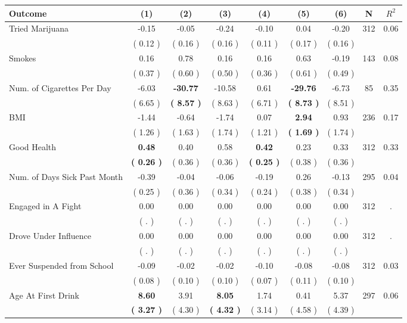 \begin{tabular}{lcccccccc}
\toprule
 \textbf{Outcome} & \textbf{(1)} & \textbf{(2)} & \textbf{(3)} & \textbf{(4)} & \textbf{(5)} & \textbf{(6)} & \textbf{N} & \textbf{$ R^2$} \\
\midrule
Tried Marijuana &     -0.15 &     -0.05 &     -0.24 &     -0.10 &      0.04 &     -0.20 & 312 &       0.06 \\ 
 & (     0.12 ) & (     0.16 ) & (     0.16 ) & (     0.11 ) & (     0.17 ) & (     0.16 ) & \\
Smokes &      0.16 &      0.78 &      0.16 &      0.16 &      0.63 &     -0.19 & 143 &       0.08 \\ 
 & (     0.37 ) & (     0.60 ) & (     0.50 ) & (     0.36 ) & (     0.61 ) & (     0.49 ) & \\
Num. of Cigarettes Per Day &     -6.03 & \textbf{   -30.77} &    -10.58 &      0.61 & \textbf{   -29.76} &     -6.73 & 85 &       0.35 \\ 
 & (     6.65 ) & \textbf{(     8.57 )} & (     8.63 ) & (     6.71 ) & \textbf{(     8.73 )} & (     8.51 ) & \\
BMI &     -1.44 &     -0.64 &     -1.74 &      0.07 & \textbf{     2.94} &      0.93 & 236 &       0.17 \\ 
 & (     1.26 ) & (     1.63 ) & (     1.74 ) & (     1.21 ) & \textbf{(     1.69 )} & (     1.74 ) & \\
Good Health & \textbf{     0.48} &      0.40 &      0.58 & \textbf{     0.42} &      0.23 &      0.33 & 312 &       0.33 \\ 
 & \textbf{(     0.26 )} & (     0.36 ) & (     0.36 ) & \textbf{(     0.25 )} & (     0.38 ) & (     0.36 ) & \\
Num. of Days Sick Past Month &     -0.39 &     -0.04 &     -0.06 &     -0.19 &      0.26 &     -0.13 & 295 &       0.04 \\ 
 & (     0.25 ) & (     0.36 ) & (     0.34 ) & (     0.24 ) & (     0.38 ) & (     0.34 ) & \\
Engaged in A Fight &      0.00 &      0.00 &      0.00 &      0.00 &      0.00 &      0.00 & 312 &          . \\ 
 & (        . ) & (        . ) & (        . ) & (        . ) & (        . ) & (        . ) & \\
Drove Under Influence &      0.00 &      0.00 &      0.00 &      0.00 &      0.00 &      0.00 & 312 &          . \\ 
 & (        . ) & (        . ) & (        . ) & (        . ) & (        . ) & (        . ) & \\
Ever Suspended from School &     -0.09 &     -0.02 &     -0.02 &     -0.10 &     -0.08 &     -0.08 & 312 &       0.03 \\ 
 & (     0.08 ) & (     0.10 ) & (     0.10 ) & (     0.07 ) & (     0.11 ) & (     0.10 ) & \\
Age At First Drink & \textbf{     8.60} &      3.91 & \textbf{     8.05} &      1.74 &      0.41 &      5.37 & 297 &       0.06 \\ 
 & \textbf{(     3.27 )} & (     4.30 ) & \textbf{(     4.32 )} & (     3.14 ) & (     4.58 ) & (     4.39 ) & \\
\bottomrule
\end{tabular}
